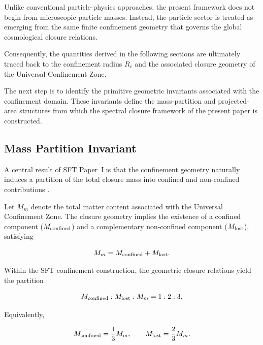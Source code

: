 \documentclass[11pt]{article}
\theoremstyle{definition}
\theoremstyle{remark}
\begin{document}
Unlike conventional particle-physics approaches, the present
framework does not begin from microscopic particle masses.
Instead, the particle sector is treated as emerging from the
same finite confinement geometry that governs the global
cosmological closure relations.

Consequently, the quantities derived in the following sections
are ultimately traced back to the confinement radius \(R_c\)
and the associated closure geometry of the Universal
Confinement Zone.

The next step is to identify the primitive geometric invariants
associated with the confinement domain. These invariants define
the mass-partition and projected-area structures from which the
spectral closure framework of the present paper is constructed.



\subsection{Mass Partition Invariant}
\label{subsec:mass_partition_invariant}

A central result of SFT Paper~I is that the confinement geometry
naturally induces a partition of the total closure mass into
confined and non-confined contributions \cite{Egbon2025I}.

Let \(M_m\) denote the total matter content associated with the
Universal Confinement Zone. The closure geometry implies the
existence of a confined component ($M_{\rm confined}$) and a
complementary non-confined component ($M_{\rm lost}$), satisfying

\begin{equation}
M_m = M_{\rm confined} + M_{\rm lost}.
\label{eq:mass_partition_total}
\end{equation}

Within the SFT confinement construction, the geometric closure
relations yield the partition

\begin{equation}
M_{\rm confined} : M_{\rm lost} : M_m = 1 : 2 : 3.
\label{eq:mass_partition_ratio}
\end{equation}

Equivalently,

\begin{equation}
M_{\rm confined} = \frac{1}{3}M_m,
\qquad
M_{\rm lost} = \frac{2}{3}M_m.
\label{eq:mass_partition_fraction}
\end{equation}
\end{document}
